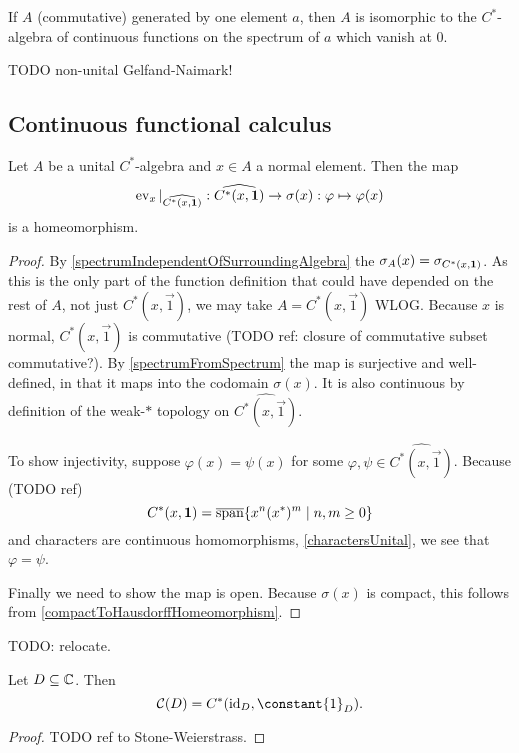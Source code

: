 \begin{proposition}
If $A$ (commutative) generated by one element $a$, then $A$ is isomorphic to the $C^*$-algebra of continuous functions on the spectrum of $a$ which vanish at $0$.
\end{proposition}

TODO non-unital Gelfand-Naimark!

\subsection{Continuous functional calculus}

\begin{lemma} \label{generatedAlgebraSpectrumHomeomorphism}
Let $A$ be a unital $C^*$-algebra and $x\in A$ a normal element. Then the map
\[ \operatorname{ev}_x|_{\widehat{C^*(x,\boldsymbol{\mathrm{1}})}}: \widehat{C^*(x,\boldsymbol{\mathrm{1}})}\to \sigma(x): \varphi \mapsto \varphi(x) \]
is a homeomorphism.
\end{lemma}
\begin{proof}
By \ref{spectrumIndependentOfSurroundingAlgebra} the $\sigma_A(x) = \sigma_{C^*(x,\boldsymbol{\mathrm{1}})}$. As this is the only part of the function definition that could have depended on the rest of $A$, not just $C^*(x,\vec{1})$, we may take $A = C^*(x,\vec{1})$ WLOG. Because $x$ is normal, $C^*(x,\vec{1})$ is commutative (TODO ref: closure of commutative subset commutative?). By \ref{spectrumFromSpectrum} the map is surjective and well-defined, in that it maps into the codomain $\sigma(x)$. It is also continuous by definition of the weak-$*$ topology on $\widehat{C^*(x,\vec{1})}$.

To show injectivity, suppose $\varphi(x) = \psi(x)$ for some $\varphi,\psi\in\widehat{C^*(x,\vec{1})}$. Because (TODO ref)
\[ C^*(x,\vec{1}) = \overline{\Span}\setbuilder{x^n(x^*)^m}{n,m\geq 0} \]
and characters are continuous homomorphisms, \ref{charactersUnital}, we see that $\varphi = \psi$.

Finally we need to show the map is open. Because $\sigma(x)$ is compact, this follows from \ref{compactToHausdorffHomeomorphism}.
\end{proof}


TODO: relocate.
\begin{lemma} \label{WeierstrassApproximation}
Let $D\subseteq \mathbb{C}$. Then
\[ \cont(D) = C^*(\id_D, \constant{1}_D). \]
\end{lemma}
\begin{proof}
TODO ref to Stone-Weierstrass.
\end{proof}

